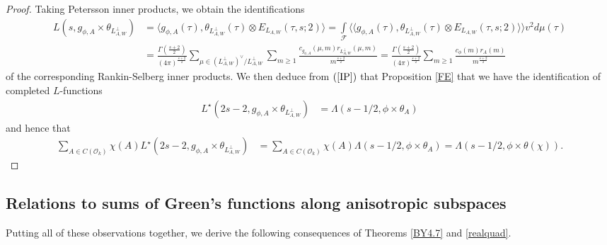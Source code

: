 \documentclass{amsart}
\theoremstyle{definition}
\theoremstyle{definition}
\theoremstyle{definition}
\begin{document}
\begin{proof}
Taking Petersson inner products, we obtain the identifications 
\begin{equation*}\begin{aligned} L(s, g_{\phi, A} \times \theta_{L_{A,W}^{\perp}}) &=
\langle  g_{\phi, A}(\tau), \theta_{L_{A,W}^{\perp}}(\tau) \otimes E_{L_{A,W}}(\tau, s; 2) \rangle
= \int\limits_{\mathcal{F}} \langle \langle g_{\phi, A}(\tau), \theta_{L_{A,W}^{\perp}}(\tau) \otimes E_{L_{A,W}}(\tau, s; 2) \rangle \rangle v^2 d\mu(\tau) \\
&= \frac{ \Gamma \left( \frac{s+2}{2} \right)  }{ (4 \pi)^{ \frac{s+2}{2}  } }
\sum\limits_{ \mu \in (L_{A,W}^{\perp})^{\vee} / L_{A,W}^{\perp} } \sum\limits_{m \geq 1} 
\frac{  c_{g_{\phi, A}}(\mu, m) r_{ L_{A,W}^{\perp} }(\mu, m) }{ m^{ \frac{s+2}{2} } } =  \frac{ \Gamma \left( \frac{s+2}{2} \right)  }{ (4 \pi)^{ \frac{s+2}{2}  } }
\sum\limits_{m \geq 1} \frac{  c_{\phi}(m) r_A(m) }{ m^{\frac{s+2}{2}} } \end{aligned}\end{equation*}
of the corresponding Rankin-Selberg inner products. 
We then deduce from $(\ref{IP})$ that Proposition \ref{FE} that we have the identification of completed $L$-functions
\begin{align*} L^{\star}(2s-2, g_{\phi, A} \times \theta_{L_{A,W}^{\perp}}) &= \Lambda(s-1/2, \phi \times \theta_A) \end{align*}
and hence that 
\begin{align*} \sum_{A \in C(\mathcal{O}_k)} \chi(A) L^{\star}(2s-2, g_{\phi, A} \times \theta_{L_{A,W}^{\perp}}) &= 
\sum_{A \in C(\mathcal{O}_k)} \chi(A) \Lambda(s-1/2, \phi \times \theta_A) = \Lambda(s-1/2, \phi \times \theta(\chi)). \end{align*}
\end{proof}

\subsection{Relations to sums of Green's functions along anisotropic subspaces}

Putting all of these observations together, we derive the following consequences of Theorems \ref{BY4.7} and \ref{realquad}.
\end{document}
